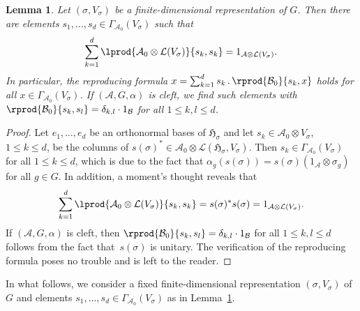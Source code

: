 \documentclass[pdftex]{sigma}
\numberwithin{equation}{section}
\newtheorem{Lemma}[Theorem]{Lemma}
\newcommand*{\tensor}{\otimes}		%
\newcommand*{\acts}{\,.\,}
\newcommand*{\hilb}{\mathfrak}		%
\newcommand*{\alg}{\mathcal}		%
\newcommand*{\hH}{\hilb{H}}			%
\newcommand*{\one}{1}				%
\newcommand*{\aA}{\alg{A}}			%
\newcommand*{\aB}{\alg{B}} 			%
\newcommand*{\End}{\mathcal{L}} %
\begin{document}
\begin{Lemma}\label{lem:partition}
	Let $(\sigma,V_\sigma)$ be a finite-dimensional representation of $G$.
	Then there are elements $s_1, \dots, s_d \in \Gamma_{\aA_0}(V_\sigma)$ such that
	\begin{gather*}
		\sum_{k=1}^d \lprod{\aA_0 \tensor \End(V_\sigma)}{s_k,s_k}= \one_{\aA \tensor \End(V_\sigma)}.
	\end{gather*}
	In particular, the reproducing formula $x = \sum_{k=1}^d s_k \acts \rprod{\aB_0}{s_k,x}$ holds for all $x \in \Gamma_{\aA_0}(V_\sigma)$.
	If $(\aA, G, \alpha)$ is cleft, we find such elements with $\rprod{\aB_0}{s_k,s_l} = \delta_{k,l} \cdot \one_\aB$ for all $1\leq k,l \leq d$.
\end{Lemma}
\begin{proof}
	Let $e_1,\dots,e_d$ be an orthonormal bases of $\hH_\sigma$ and let $s_k \in \aA_0 \tensor V_\sigma$, $1 \leq k \leq d$, be the columns of $s(\sigma)^* \in \aA_0 \tensor \End(\hH_\sigma,V_\sigma) $.
	Then $s_k \in \Gamma_{\aA_0}(V_\sigma)$ for all $1 \leq k \leq d$, which is due to the fact that $\alpha_g(s(\sigma)) = s(\sigma) (\one_\aA \tensor \sigma_g)$ for all $g \in G$.
	In addition, a moment's thought reveals that
	\begin{align*}
		\sum_{k=1}^d \lprod{\aA_0 \tensor \End(V_\sigma)}{s_k,s_k} = s(\sigma)^* s(\sigma) = \one_{\aA \tensor \End(V_\sigma)}.
	\end{align*}
	If $(\aA, G, \alpha)$ is cleft, then $\rprod{\aB_0}{s_k,s_l} = \delta_{k,l} \cdot \one_\aB$ for all $1\leq k,l \leq d$ follows from the fact that~$s(\sigma)$ is unitary. The verification of the reproducing formula poses no trouble and is left to the reader.
\end{proof}

In what follows, we consider a fixed finite-dimensional representation $(\sigma,V_\sigma)$ of $G$ and elements $s_1, \dots, s_d \in \Gamma_{\aA_0}(V_\sigma)$ as in Lemma~\ref{lem:partition}.
\end{document}
